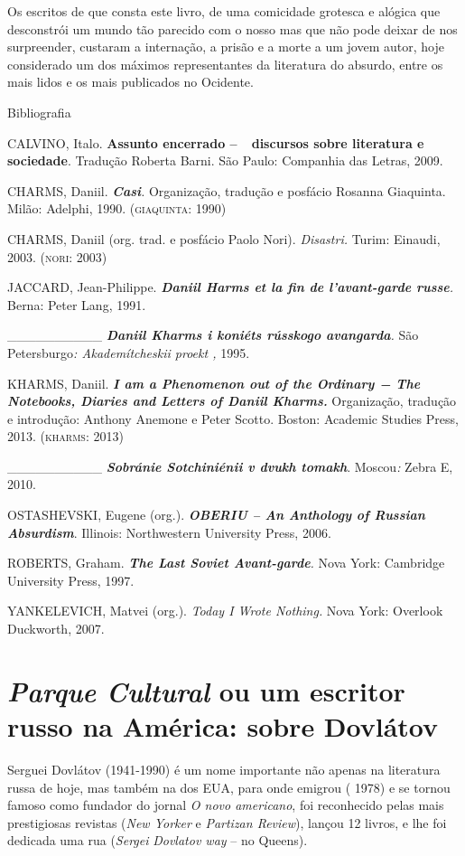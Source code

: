 Os escritos de que consta este livro, de uma comicidade grotesca e
alógica que desconstrói um mundo tão parecido com o nosso mas que não
pode deixar de nos surpreender, custaram a internação, a prisão e a
morte a um jovem autor, hoje considerado um dos máximos representantes
da literatura do absurdo, entre os mais lidos e os mais publicados no
Ocidente.

Bibliografia

CALVINO, Italo. \textbf{Assunto encerrado --~~discursos sobre literatura
e sociedade}. Tradução Roberta Barni. São Paulo: Companhia das Letras,
2009.

CHARMS, Daniil. \emph{\textbf{Casi}.} Organização, tradução e posfácio
Rosanna Giaquinta. Milão: Adelphi, 1990. (\textsc{giaquinta}: 1990)

CHARMS, Daniil (org. trad. e posfácio Paolo Nori). \emph{Disastri.}
Turim: Einaudi, 2003. (\textsc{nori}: 2003)

JACCARD, Jean-Philippe. \emph{\textbf{Daniil Harms et la fin de
l'avant-garde russe}.} Berna: Peter Lang, 1991.~

\_\_\_\_\_\_\_\_\_\_ \emph{\textbf{Daniil Kharms i koniéts rússkogo
avangarda}.} São Petersburgo\emph{: Akademítcheskii proekt ,} 1995.

KHARMS, Daniil. \emph{\textbf{I am a Phenomenon out of the Ordinary −
The Notebooks, Diaries and Letters of Daniil Kharms.}} Organização,
tradução e introdução: Anthony Anemone e Peter Scotto. Boston: Academic
Studies Press, 2013. (\textsc{kharms}: 2013)

\_\_\_\_\_\_\_\_\_\_ \emph{\textbf{Sobránie Sotchiniénii v dvukh
tomakh}}. Moscou\emph{:} Zebra E, 2010.

OSTASHEVSKI, Eugene (org.). \emph{\textbf{OBERIU -- An Anthology of
Russian Absurdism}}. Illinois: Northwestern University Press, 2006.

ROBERTS, Graham. \emph{\textbf{The Last Soviet Avant-garde}.} Nova York:
Cambridge University Press, 1997.

YANKELEVICH, Matvei (org.). \emph{Today I Wrote Nothing.} Nova York:
Overlook Duckworth, 2007.

\chapter{\emph{Parque Cultural} ou um escritor russo na América: sobre 
Dovlátov}

Serguei Dovlátov (1941-1990) é um nome importante não apenas na
literatura russa de hoje, mas também na dos EUA, para onde emigrou (
1978) e se tornou famoso como fundador do jornal \emph{O novo
americano}, foi reconhecido pelas mais prestigiosas revistas (\emph{New
Yorker} e \emph{Partizan Review}), lançou 12 livros, e lhe foi dedicada
uma rua (\emph{Sergei} \emph{Dovlatov way} -- no Queens).

